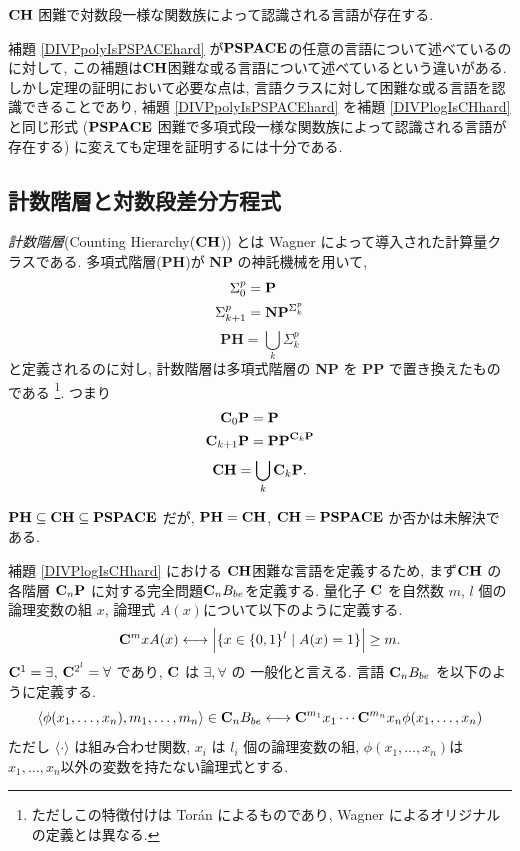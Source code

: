 \begin{lemma}
 \label{DIVPlogIsCHhard}
 $\mathbf{CH}$ 困難で対数段一様な関数族によって認識される言語が存在する.
\end{lemma}

補題 \ref{DIVPpolyIsPSPACEhard} が$\mathbf{PSPACE}$の任意の言語について述べているのに対して,
この補題は$\mathbf{CH}$困難な或る言語について述べているという違いがある.
しかし定理の証明において必要な点は, 言語クラスに対して困難な或る言語を認識できることであり,
補題 \ref{DIVPpolyIsPSPACEhard} を補題 \ref{DIVPlogIsCHhard} と同じ形式
($\mathbf{PSPACE}$ 困難で多項式段一様な関数族によって認識される言語が存在する)
に変えても定理を証明するには十分である.


\subsection{計数階層と対数段差分方程式}
\label{subsection: counting hierarchy}

\emph{計数階層}(Counting Hierarchy($\mathbf{CH}$)) とは
Wagner によって導入された計算量クラスである\cite{wagner1986complexity}.
多項式階層({\bf PH})が {\bf NP} の神託機械を用いて,
\begin{align*}
 \Sigma^p_0 
 &= \mathbf{P} \\
 \Sigma^p_{k+1}
 &= \mathbf{NP}^{\Sigma^p_k}
\end{align*}
\[
 \mathbf{PH} = \bigcup_k \Sigma^p_k
\]
と定義されるのに対し,
計数階層は多項式階層の {\bf NP} を {\bf PP} で置き換えたものである
\footnote{ただしこの特徴付けは Tor{\'a}n によるものであり,
Wagner によるオリジナルの定義とは異なる\cite{toran1991complexity}.
}. つまり
\begin{align*}
 \mathbf{C}_0 \mathbf{P}  
 &= \mathbf{P} \\
 \mathbf{C}_{k+1} \mathbf{P}
 &= \mathbf{PP}^{\mathbf{C}_k \mathbf{P}}
\end{align*}
\[
 \mathbf{CH} = \bigcup_k \mathbf{C}_k \mathbf{P}.
\]

$\mathbf{PH} \subseteq \mathbf{CH} \subseteq \mathbf{PSPACE}$ だが,
$\mathbf{PH} = \mathbf{CH}$, $\mathbf{CH} = \mathbf{PSPACE}$
か否かは未解決である.

補題 \ref{DIVPlogIsCHhard} における $\mathbf{CH}$困難な言語を定義するため, まず$\mathbf{CH}$ の各階層 $\mathbf{C}_n \mathbf{P}$ に対する完全問題$\mathbf{C}_n B_{be}$を定義する\cite[定理 7]{wagner1986complexity}.
量化子 $\mathbf{C}$ を自然数 $m$, $l$ 個の論理変数の組 $x$,
論理式 $A(x)$について以下のように定義する.
\begin{equation}
 \mathbf{C}^m x A(x) 
  \longleftrightarrow 
  \Bigl|\{x \in \{0, 1\}^l \mid A(x) = 1\}\Bigr| \ge m.
\end{equation}
$\mathbf{C}^1 = \exists$, $\mathbf{C}^{2^l} = \forall$ であり, $\mathbf{C}$ は $\exists, \forall$ の
一般化と言える.
言語 $\mathbf{C}_n B_{be}$ を以下のように定義する.
\begin{equation}
 \langle \phi(x_1, \dots, x_n), m_1, \dots, m_n \rangle \in \mathbf{C}_n B_{be}
 \longleftrightarrow
 \mathbf{C}^{m_1}{x_1} \cdots \mathbf{C}^{m_n}{x_n} \phi(x_1, \dots, x_n) 
\end{equation}
ただし $\langle \cdot \rangle$ は組み合わせ関数,
$x_i$ は $l_i$ 個の論理変数の組,
$\phi(x_1, \dots, x_n)$は$x_1, \dots, x_n$以外の変数を持たない論理式とする.

